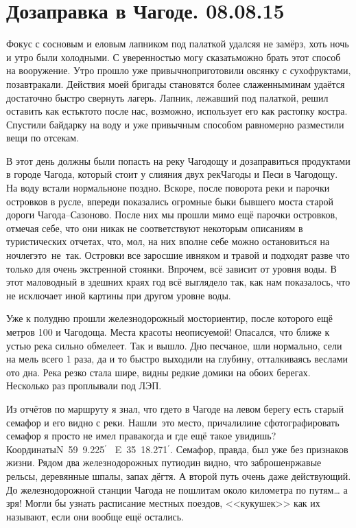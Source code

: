 \chapter{Дозаправка в Чагоде. 08.08.15}

Фокус с сосновым и еловым лапником под палаткой удался\mdash я не замёрз, хоть ночь и утро были холодными. С уверенностью могу сказать\mdash можно брать этот способ на вооружение. Утро прошло уже привычно\mdash приготовили овсянку с сухофруктами, позавтракали. Действия моей бригады становятся более слаженными\mdash нам удаётся достаточно быстро свернуть лагерь. Лапник, лежавший под палаткой, решил оставить как есть\mdash кто\sdash то после нас, возможно, использует его как растопку костра. Спустили байдарку на воду и уже привычным  способом равномерно разместили вещи по отсекам. 

В этот день должны были попасть на реку Чагодощу и дозаправиться продуктами в городе Чагода, который стоит у слияния двух рек\mdash Чагоды и Песи в Чагодощу. На воду встали нормально\mdash не поздно. Вскоре, после поворота реки и парочки островков в русле, впереди показались огромные быки бывшего моста старой дороги Чагода\nobreakdash--Сазоново. После них мы прошли мимо ещё парочки островков, отмечая себе, что они никак не соответствуют некоторым описаниям в туристических отчетах, что, мол, на них вполне себе можно остановиться на ночлег\mdash это~не~так. Островки все заросшие ивняком и травой и подходят разве что только для очень экстренной стоянки. Впрочем, всё зависит от уровня воды. В этот маловодный в здешних краях год всё выглядело так, как нам показалось, что не исключает иной картины при другом уровне воды. 

Уже к полудню прошли железнодорожный мост\mdash ориентир, после которого ещё метров 100 и Чагодоща. Места красоты неописуемой! Опасался, что ближе к устью река сильно обмелеет. Так и вышло. Дно песчаное, шли нормально, сели на мель всего 1 раза, да и то быстро выходили на глубину, отталкиваясь веслами ото дна. Река резко стала шире, видны редкие домики на обоих берегах. Несколько раз проплывали под ЛЭП. 

Из отчётов по маршруту я знал, что где\sdash то в Чагоде на левом берегу есть старый семафор и его видно с реки. Нашли~это место, причалили\mdash не сфотографировать семафор я просто не имел права\mdash когда и где ещё такое увидишь? Координаты\mdash N~59\degree~9.225$^\prime$~ E~35\degree~18.271$^\prime$. Семафор, правда, был уже без признаков жизни. Рядом два железнодорожных пути\mdash один видно, что заброшен\mdash ржавые рельсы, деревянные шпалы, запах дёгтя. А второй путь очень даже действующий. До железнодорожной станции Чагода не пошли\mdash там около километра по путям… а зря! Могли бы узнать расписание местных поездов, <<кукушек>> как их называют, если они вообще ещё остались. 

